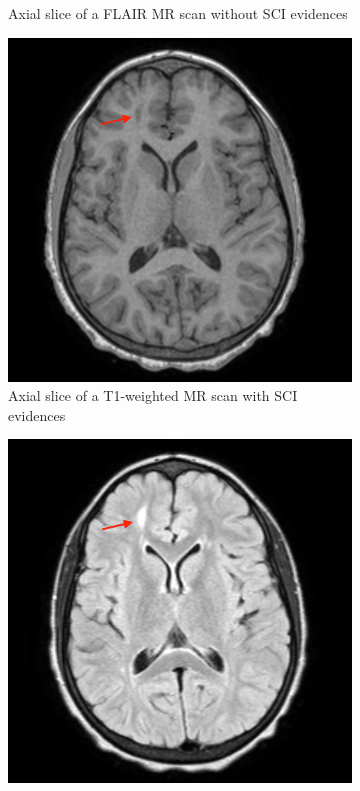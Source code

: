 \documentclass{standalone}
\begin{document}
\begin{figure}[h!]
\begin{subfigure}[b]{0.45\textwidth}
             \caption{Axial slice of a FLAIR MR scan without SCI evidences}
             \label{fig:Normal_flair}
        \end{subfigure}
        \hfill
        \vfill
        \begin{subfigure}[b]{0.45\textwidth}
             \includegraphics[scale=0.12]{img/Chap1/Lesion_T1.png}
             \caption{Axial slice of a T1-weighted MR scan with SCI evidences}
             \label{fig:SCI_T1}
        \end{subfigure}
        \hfill
        \begin{subfigure}[b]{0.45\textwidth}
             \includegraphics[scale=0.12]{img/Chap1/Lesion_flair.png}

\end{subfigure}
\end{figure}
\end{document}

